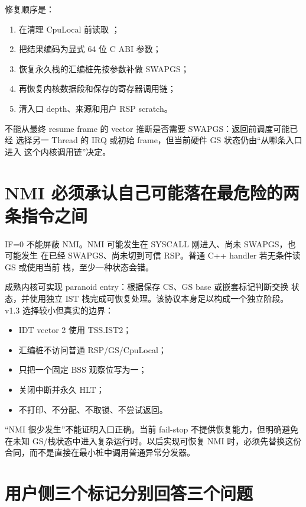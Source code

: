 修复顺序是：

\begin{enumerate}[label=\arabic*.]
  \item 在清理 CpuLocal 前读取 ；
  \item 把结果编码为显式 64 位 C ABI 参数；
  \item 恢复永久栈的汇编桩先按参数补做 SWAPGS；
  \item 再恢复内核数据段和保存的寄存器调用链；
  \item {} 清入口 depth、来源和用户 RSP scratch。
\end{enumerate}

不能从最终 resume frame 的 vector 推断是否需要 SWAPGS：返回前调度可能已经
选择另一 Thread 的 IRQ 或初始 frame，但当前硬件 GS 状态仍由“从哪条入口进入
这个内核调用链”决定。

\section{NMI 必须承认自己可能落在最危险的两条指令之间}

IF=0 不能屏蔽 NMI。NMI 可能发生在 SYSCALL 刚进入、尚未 SWAPGS，也可能发生
在已经 SWAPGS、尚未切到可信 RSP。普通 C++ handler 若无条件读 GS 或使用当前
栈，至少一种状态会错。

成熟内核可实现 paranoid entry：根据保存 CS、GS base 或嵌套标记判断交换
状态，并使用独立 IST 栈完成可恢复处理。该协议本身足以构成一个独立阶段。
v1.3 选择较小但真实的边界：

\begin{itemize}
  \item IDT vector 2 使用 TSS.IST2；
  \item 汇编桩不访问普通 RSP/GS/CpuLocal；
  \item 只把一个固定 BSS 观察位写为一；
  \item 关闭中断并永久 HLT；
  \item 不打印、不分配、不取锁、不尝试返回。
\end{itemize}

\begin{failurebox}
“NMI 很少发生”不能证明入口正确。当前 fail-stop 不提供恢复能力，但明确避免
在未知 GS/栈状态中进入复杂运行时。以后实现可恢复 NMI 时，必须先替换这份
合同，而不是直接在最小桩中调用普通异常分发器。
\end{failurebox}

\section{用户侧三个标记分别回答三个问题}

